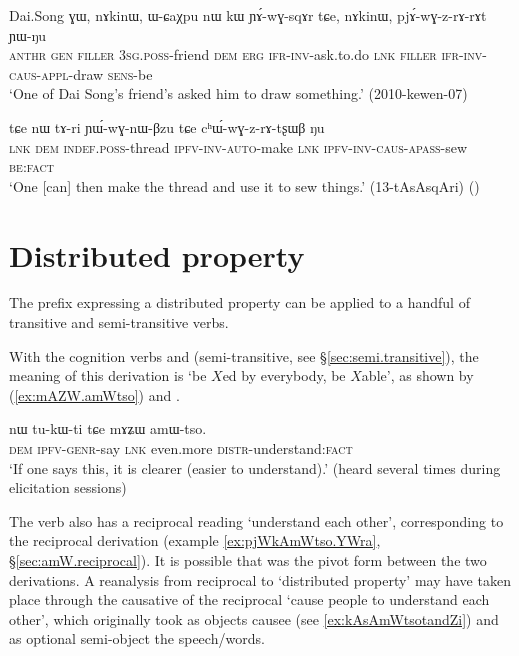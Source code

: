 \begin{exe}
\ex  \label{ex:pjAwGzrArAt}
\gll  Dai.Song ɣɯ, nɤkinɯ, ɯ-ɕaχpu nɯ kɯ ɲɤ́-wɣ-sqɤr tɕe, nɤkinɯ, pjɤ́-wɣ-z-rɤ-rɤt ɲɯ-ŋu \\
\textsc{anthr} \textsc{gen} \textsc{filler} \textsc{3sg}.\textsc{poss}-friend \textsc{dem} \textsc{erg} \textsc{ifr}-\textsc{inv}-ask.to.do \textsc{lnk} \textsc{filler} \textsc{ifr}-\textsc{inv}-\textsc{caus}-\textsc{appl}-draw \textsc{sens}-be \\
\glt `One of Dai Song's friend's asked him to draw something.' (2010-kewen-07)
\end{exe}  
 
 
 \begin{exe}
\ex  \label{ex:chWwGzrArtsxWB}
\gll  tɕe nɯ tɤ-ri ɲɯ́-wɣ-nɯ-βzu tɕe cʰɯ́-wɣ-z-rɤ-tʂɯβ ŋu \\
\textsc{lnk} \textsc{dem} \textsc{indef}.\textsc{poss}-thread \textsc{ipfv}-\textsc{inv}-\textsc{auto}-make \textsc{lnk} \textsc{ipfv}-\textsc{inv}-\textsc{caus}-\textsc{apass}-sew \textsc{be}:\textsc{fact} \\
\glt `One [can] then make the thread and use it to sew things.' (13-tAsAsqAri) ()
\end{exe}  

\section{Distributed property} \label{sec:distributed.amW}
The  prefix expressing a distributed property can be applied to a handful of transitive and semi-transitive verbs.
 
With the cognition verbs  and  (semi-transi\-tive, see §\ref{sec:semi.transitive}), the meaning of this derivation is `be $X$ed by everybody, be $X$able', as shown by  (\ref{ex:mAZW.amWtso}) and .

\begin{exe}
\ex \label{ex:mAZW.amWtso}
 \gll nɯ tu-kɯ-ti tɕe mɤʑɯ amɯ-tso. \\
 \textsc{dem} \textsc{ipfv}-\textsc{genr}-say \textsc{lnk} even.more \textsc{distr}-understand:\textsc{fact} \\
 \glt  `If one says this, it is clearer (easier to understand).'  (heard several times during elicitation sessions)
\end{exe}

The verb  also has a reciprocal reading `understand each other', corresponding to the  reciprocal derivation (example \ref{ex:pjWkAmWtso.YWra}, §\ref{sec:amW.reciprocal}). It is possible that  was the pivot form between the two derivations. A reanalysis from reciprocal to `distributed property' may have taken place through the causative of the reciprocal  `cause people to understand each other', which originally took as objects causee (see \ref{ex:kAsAmWtsotandZi}) and as optional semi-object the speech/words. 

